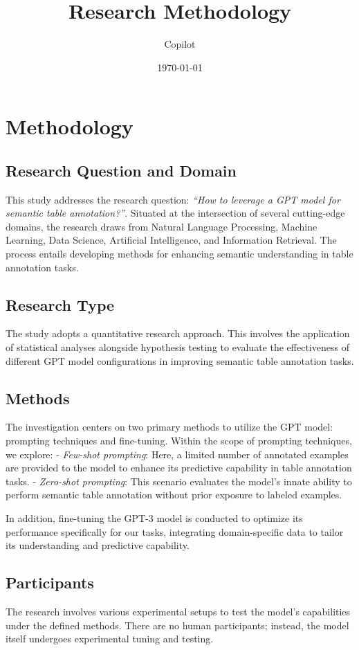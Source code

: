 \documentclass{article}
\title{Research Methodology}
\author{Copilot}
\date{\today}
\begin{document}
\maketitle

\section{Methodology}

\subsection{Research Question and Domain}
This study addresses the research question: \textit{``How to leverage a GPT model for semantic table annotation?''}. Situated at the intersection of several cutting-edge domains, the research draws from Natural Language Processing, Machine Learning, Data Science, Artificial Intelligence, and Information Retrieval. The process entails developing methods for enhancing semantic understanding in table annotation tasks.

\subsection{Research Type}
The study adopts a quantitative research approach. This involves the application of statistical analyses alongside hypothesis testing to evaluate the effectiveness of different GPT model configurations in improving semantic table annotation tasks.

\subsection{Methods}
The investigation centers on two primary methods to utilize the GPT model: prompting techniques and fine-tuning. Within the scope of prompting techniques, we explore:
- \textit{Few-shot prompting}: Here, a limited number of annotated examples are provided to the model to enhance its predictive capability in table annotation tasks.
- \textit{Zero-shot prompting}: This scenario evaluates the model's innate ability to perform semantic table annotation without prior exposure to labeled examples.

In addition, fine-tuning the GPT-3 model is conducted to optimize its performance specifically for our tasks, integrating domain-specific data to tailor its understanding and predictive capability.

\subsection{Participants}
The research involves various experimental setups to test the model's capabilities under the defined methods. There are no human participants; instead, the model itself undergoes experimental tuning and testing.
\end{document}
